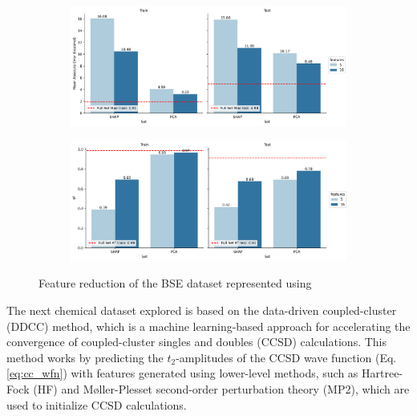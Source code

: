 \documentclass[journal=jacsat,manuscript=article]{achemso}
\begin{document}
\begin{figure}[H]
	\centering	
	\begin{subfigure}[b]{0.49\textwidth}
		\centering
		\includegraphics[width=\textwidth]{../images/BSE/classical_features_MAE.png}
		\caption{}
		\label{fig:BSE_bse_classical_features_MAE}
	\end{subfigure}
	\hfill		
	\begin{subfigure}[b]{0.49\textwidth}
		\centering
		\includegraphics[width=\textwidth]{../images/BSE/classical_features_R2.png}
		\caption{}
		\label{fig:BSE_classical_features_R2}
	\end{subfigure}
	\caption{Feature reduction of the BSE dataset represented using }
	\label{fig:bse_classical_features}
\end{figure}


The next chemical dataset explored is based on the data-driven coupled-cluster (DDCC) method, which is a machine learning-based approach for accelerating the convergence of coupled-cluster singles and doubles (CCSD) calculations.\cite{townsend_data-driven_2019,jones_chapter_2023}
This method works by predicting the $t_{2}$-amplitudes of the CCSD wave function (Eq. \ref{eq:cc_wfn}) with features generated using lower-level methods, such as Hartree-Fock (HF) and M{\o}ller-Plesset second-order perturbation theory (MP2), which are used to initialize CCSD calculations.
\end{document}
